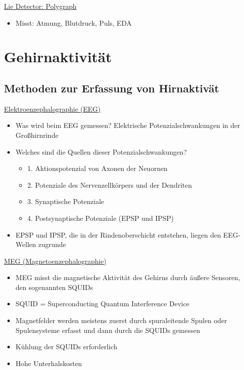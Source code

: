 \documentclass[a4paper,10pt,oneside]{article}
\begin{document}
\underline{Lie Detector: Polygraph} \\
	\begin{itemize}
		\item Misst: Atmung, Blutdruck, Puls, EDA
	\end{itemize}
	
\section{Gehirnaktivität}
\subsection{Methoden zur Erfassung von Hirnaktivät}

\underline{Elektroenzephalographie (EEG)} \\
	\begin{itemize}
		\item Was wird beim EEG gemessen? Elektrische Potenzialschwankungen in der Großhirnrinde
		\item Welches sind die Quellen dieser Potenzialschwankungen?
			\begin{itemize}
				\item 1. Aktionspotenzial von Axonen der Neuornen
				\item 2. Potenziale des Nervenzellkörpers und der Dendriten
				\item 3. Synaptische Potenziale 
				\item 4. Postsynaptische Potenziale (EPSP und IPSP)
			\end{itemize}
		\item EPSP und IPSP, die in der Rindenoberschicht entstehen, liegen den EEG-Wellen zugrunde
	\end{itemize}
	
\underline{MEG (Magnetoenzephalographie)} \\
	\begin{itemize}
		\item MEG misst die magnetische Aktivität des Gehirns durch äußere Sensoren, den sogenannten SQUIDs
		\item SQUID = Superconducting Quantum Interference Device
		\item Magnetfelder werden meistens zuerst durch spuraleitende Spulen oder Spulensysteme erfasst und dann durch die SQUIDs gemessen
		\item Kühlung der SQUIDs erforderlich
		\item Hohe Unterhalskosten
	\end{itemize}
	
\end{document}
